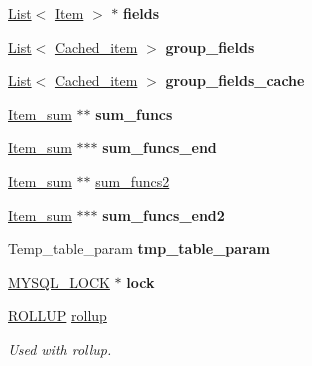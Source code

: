 \begin{DoxyCompactItemize}
\mbox{\hyperlink{classList}{List}}$<$ \mbox{\hyperlink{classItem}{Item}} $>$ $\ast$ {\bfseries fields}
\item 
\mbox{\label{classJOIN_a171e4827435c98c8a0c8aa2d5beeba80}} 
\mbox{\hyperlink{classList}{List}}$<$ \mbox{\hyperlink{classCached__item}{Cached\+\_\+item}} $>$ {\bfseries group\+\_\+fields}
\item 
\mbox{\label{classJOIN_a9ed0ec0f30f64ba48e7ab37710ec8088}} 
\mbox{\hyperlink{classList}{List}}$<$ \mbox{\hyperlink{classCached__item}{Cached\+\_\+item}} $>$ {\bfseries group\+\_\+fields\+\_\+cache}
\item 
\mbox{\label{classJOIN_a143b8b13380d62825c50caef62a792f8}} 
\mbox{\hyperlink{classItem__sum}{Item\+\_\+sum}} $\ast$$\ast$ {\bfseries sum\+\_\+funcs}
\item 
\mbox{\label{classJOIN_a365335b1295740646632aec80e0e9dde}} 
\mbox{\hyperlink{classItem__sum}{Item\+\_\+sum}} $\ast$$\ast$$\ast$ {\bfseries sum\+\_\+funcs\+\_\+end}
\item 
\mbox{\hyperlink{classItem__sum}{Item\+\_\+sum}} $\ast$$\ast$ \mbox{\hyperlink{classJOIN_ae436940b22d4633041116b1cde227dc0}{sum\+\_\+funcs2}}
\item 
\mbox{\label{classJOIN_ad2d0e99c490ff6562b1c1dd340655dea}} 
\mbox{\hyperlink{classItem__sum}{Item\+\_\+sum}} $\ast$$\ast$$\ast$ {\bfseries sum\+\_\+funcs\+\_\+end2}
\item 
\mbox{\label{classJOIN_a7344d307c29bc2f918d2758e1443e24f}} 
Temp\+\_\+table\+\_\+param {\bfseries tmp\+\_\+table\+\_\+param}
\item 
\mbox{\label{classJOIN_a1b430ca4c21d45c1d69db921a8c2e92b}} 
\mbox{\hyperlink{structst__mysql__lock}{M\+Y\+S\+Q\+L\+\_\+\+L\+O\+CK}} $\ast$ {\bfseries lock}
\item 
\mbox{\label{classJOIN_a4bb83d4cb348049167b6feef355f96f8}} 
\mbox{\hyperlink{structst__rollup}{R\+O\+L\+L\+UP}} \mbox{\hyperlink{classJOIN_a4bb83d4cb348049167b6feef355f96f8}{rollup}}
\begin{DoxyCompactList}\small\item\em Used with rollup. \end{DoxyCompactList}\item 

\end{DoxyCompactItemize}

